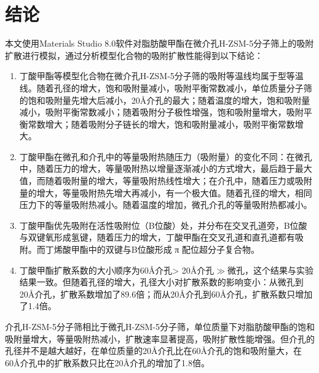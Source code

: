 \section{结论}
\par{本文使用Materials Studio 8.0软件对脂肪酸甲酯在微介孔H-ZSM-5分子筛上的吸附扩散进行模拟，通过分析模型化合物的吸附扩散性能得到以下结论：}
\begin{enumerate}
    \item 丁酸甲酯等模型化合物在微介孔H-ZSM-5分子筛的吸附等温线均属于型等温线。随着孔径的增大，饱和吸附量减小，吸附平衡常数减小，单位质量分子筛的饱和吸附量先增大后减小，20Å介孔的最大；随着温度的增大，饱和吸附量减小，吸附平衡常数减小；随着吸附分子极性增强，饱和吸附量增大，吸附平衡常数增大；随着吸附分子链长的增大，饱和吸附量减小，吸附平衡常数增大。
    \item 丁酸甲酯在微孔和介孔中的等量吸附热随压力（吸附量）的变化不同：在微孔中，随着压力的增大，等量吸附热以增量逐渐减小的方式增大，最后趋于最大值，而随着吸附量的增大，等量吸附热线性增大；在介孔中，随着压力或吸附量的增大，等量吸附热先增大再减小，有一个极大值。随着孔径的增大，相同压力下的等量吸附热减小。随着温度的增加，微孔介孔的等量吸附热都减小。
    \item 丁酸甲酯优先吸附在活性吸附位（B位酸）处，并分布在交叉孔道旁，B位酸与双键氧形成氢键，随着压力的增大，丁酸甲酯在交叉孔道和直孔道都有吸附。而丁烯酸甲酯中的双键与B位酸形成 π 配位超分子复合物。
    \item 丁酸甲酯扩散系数的大小顺序为60Å介孔> 20Å介孔$\gg$微孔，这个结果与实验结果一致。但随着孔径的增大，孔径大小对扩散系数的影响变小：从微孔到20Å介孔，扩散系数增加了89.6倍；而从20Å介孔到60Å介孔，扩散系数只增加了1.4倍。
\end{enumerate}
\par{介孔H-ZSM-5分子筛相比于微孔H-ZSM-5分子筛，单位质量下对脂肪酸甲酯的饱和吸附量增大，等量吸附热减小，扩散速率显著提高，吸附扩散性能增强。但介孔的孔径并不是越大越好，在单位质量的20Å介孔比在60Å介孔的饱和吸附量大，在60Å介孔中的扩散系数只比在20Å介孔的增加了1.8倍。}
